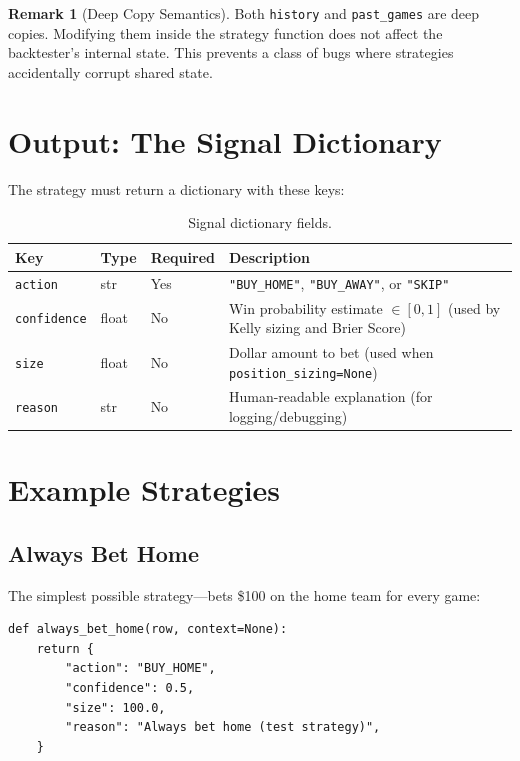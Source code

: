 \documentclass[12pt,a4paper]{report}
\theoremstyle{definition}
\newtheorem{remark}{Remark}[chapter]
\newcommand{\code}[1]{\texttt{#1}}
\begin{document}
\begin{remark}[Deep Copy Semantics]
Both \code{history} and \code{past\_games} are deep copies. Modifying them inside the strategy function does not affect the backtester's internal state. This prevents a class of bugs where strategies accidentally corrupt shared state.
\end{remark}

\section{Output: The Signal Dictionary}

The strategy must return a dictionary with these keys:

\begin{table}[H]
\centering
\caption{Signal dictionary fields.}
\label{tab:signal}
\begin{tabularx}{\textwidth}{lllX}
\toprule
\textbf{Key} & \textbf{Type} & \textbf{Required} & \textbf{Description} \\
\midrule
\code{action}     & str   & Yes  & \code{"BUY\_HOME"}, \code{"BUY\_AWAY"}, or \code{"SKIP"} \\
\code{confidence} & float & No   & Win probability estimate $\in [0, 1]$ (used by Kelly sizing and Brier Score) \\
\code{size}       & float & No   & Dollar amount to bet (used when \code{position\_sizing=None}) \\
\code{reason}     & str   & No   & Human-readable explanation (for logging/debugging) \\
\bottomrule
\end{tabularx}
\end{table}

\section{Example Strategies}

\subsection{Always Bet Home}

The simplest possible strategy—bets \$100 on the home team for every game:

\begin{lstlisting}[caption={The always\_bet\_home reference strategy.}]
def always_bet_home(row, context=None):
    return {
        "action": "BUY_HOME",
        "confidence": 0.5,
        "size": 100.0,
        "reason": "Always bet home (test strategy)",
    }
\end{lstlisting}
\end{document}

